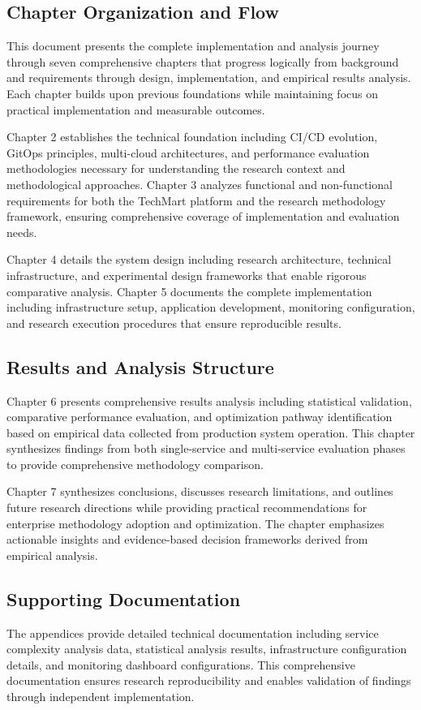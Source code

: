 \subsection{Chapter Organization and Flow}
This document presents the complete implementation and analysis journey through seven comprehensive chapters that progress logically from background and requirements through design, implementation, and empirical results analysis. Each chapter builds upon previous foundations while maintaining focus on practical implementation and measurable outcomes.

Chapter 2 establishes the technical foundation including CI/CD evolution, GitOps principles, multi-cloud architectures, and performance evaluation methodologies necessary for understanding the research context and methodological approaches. Chapter 3 analyzes functional and non-functional requirements for both the TechMart platform and the research methodology framework, ensuring comprehensive coverage of implementation and evaluation needs.

Chapter 4 details the system design including research architecture, technical infrastructure, and experimental design frameworks that enable rigorous comparative analysis. Chapter 5 documents the complete implementation including infrastructure setup, application development, monitoring configuration, and research execution procedures that ensure reproducible results.

\subsection{Results and Analysis Structure}
Chapter 6 presents comprehensive results analysis including statistical validation, comparative performance evaluation, and optimization pathway identification based on empirical data collected from production system operation. This chapter synthesizes findings from both single-service and multi-service evaluation phases to provide comprehensive methodology comparison.

Chapter 7 synthesizes conclusions, discusses research limitations, and outlines future research directions while providing practical recommendations for enterprise methodology adoption and optimization. The chapter emphasizes actionable insights and evidence-based decision frameworks derived from empirical analysis.

\subsection{Supporting Documentation}
The appendices provide detailed technical documentation including service complexity analysis data, statistical analysis results, infrastructure configuration details, and monitoring dashboard configurations. This comprehensive documentation ensures research reproducibility and enables validation of findings through independent implementation.

